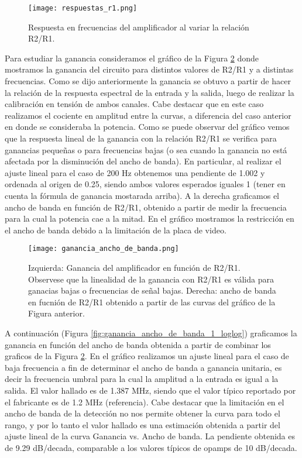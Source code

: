 \documentclass[a4paper, 11pt]{article}
\begin{document}
\begin{figure} [H]
\centering
\texttt{[image: respuestas\_r1.png]}
\caption{ Respuesta en frecuencias del amplificador al variar la relación R2/R1. \label{fig:respuestas_r1}}
\end{figure} 

Para estudiar la ganancia consideramos el gráfico de la Figura \ref{fig:ganancia_ancho_de_banda} donde mostramos la ganancia del circuito para distintos valores de R2/R1 y a distintas frecuencias. Como se dijo anteriormente la ganancia se obtuvo a partir de hacer la relación de la respuesta espectral de la entrada y la salida, luego de realizar la calibración en tensión de ambos canales. Cabe destacar que en este caso realizamos el cociente en amplitud entre la curvas, a diferencia del caso anterior en donde se consideraba la potencia. Como se puede observar del gráfico vemos que la respuesta lineal de la ganancia con la relación R2/R1 se verifica para ganancias pequeñas o para frecuencias bajas (o sea cuando la ganancia no está afectada por la disminución del ancho de banda). En particular, al realizar el ajuste lineal para el caso de 200 Hz obtenemos una pendiente de 1.002 y ordenada al origen de 0.25, siendo ambos valores esperados iguales 1 (tener en cuenta la fórmula de ganancia mostarada arriba). A la derecha graficamos el ancho de banda en función de R2/R1, obtenido a partir de medir la frecuencia para la cual la potencia cae a la mitad. En el gráfico mostramos la restricción en el ancho de banda debido a la limitación de la placa de video.

\begin{figure} [H]
\centering
\texttt{[image: ganancia\_ancho\_de\_banda.png]}
\caption{ Izquierda: Ganancia del amplificador en función de R2/R1. Observese que la linealidad de la ganancia con R2/R1 es válida para ganacias bajas o frecuencias de señal bajas. Derecha: ancho de banda en fucnión de R2/R1 obtenido a partir de las curvas del gráfico de la Figura anterior. \label{fig:ganancia_ancho_de_banda}}
\end{figure} 

A continuación (Figura \ref{fig:ganancia_ancho_de_banda_1_loglog}) graficamos la ganancia en función del ancho de banda obtenida a partir de combinar los graficos de la Figura \ref{fig:ganancia_ancho_de_banda}. En el gráfico realizamos un ajuste lineal para el caso de baja frecuencia a fin de determinar el ancho de banda a ganancia unitaria, es decir la frecuencia umbral para la cual la amplitud a la entrada es igual a la salida.
El valor hallado es de 1.387 MHz, siendo que el valor típico reportado por el fabricante es de 1.2 MHz (referencia). Cabe destacar que la limitación en el ancho de banda de la detección no nos permite obtener la curva para todo el rango, y por lo tanto el valor hallado es una estimación obtenida a partir del ajuste lineal de la curva Ganancia vs. Ancho de banda. La pendiente obtenida es de 9.29 dB/decada, comparable a los valores típicos de opamps de 10 dB/decada.
\end{document}
